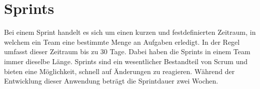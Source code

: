 \chapter{Sprints}
Bei einem Sprint handelt es sich um einen kurzen und festdefinierten Zeitraum, in welchem ein Team eine bestimmte Menge an Aufgaben erledigt. In der Regel umfasst dieser Zeitraum bis zu 30 Tage. Dabei haben die Sprints in einem Team immer dieselbe Länge. Sprints sind ein wesentlicher Bestandteil von Scrum und bieten eine Möglichkeit, schnell auf Änderungen zu reagieren.\cite{Wolf2021-ef} Während der Entwicklung dieser Anwendung beträgt die Sprintdauer zwei Wochen.

\newpage
